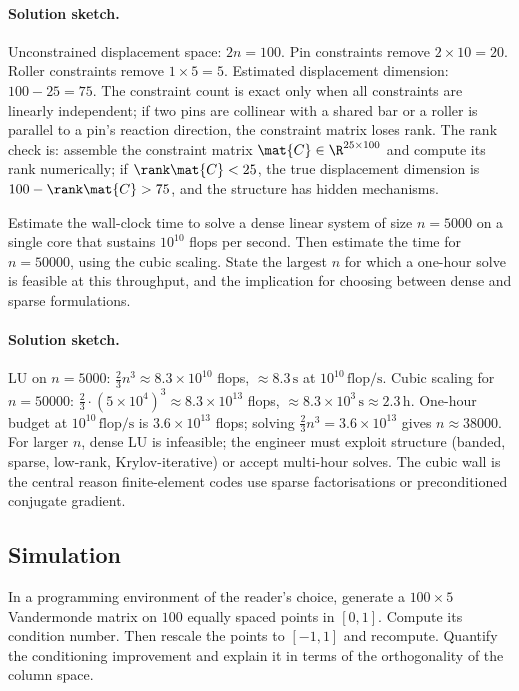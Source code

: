 \paragraph{Solution sketch.}
Unconstrained displacement space: $2 n = 100$. Pin constraints
remove $2 \times 10 = 20$. Roller constraints remove $1 \times 5
= 5$. Estimated displacement dimension: $100 - 25 = 75$. The
constraint count is exact only when all constraints are linearly
independent; if two pins are collinear with a shared bar or a
roller is parallel to a pin's reaction direction, the constraint
matrix loses rank. The rank check is: assemble the constraint
matrix $\mat{C} \in \R^{25 \times 100}$ and compute its rank
numerically; if $\rank \mat{C} < 25$, the true displacement
dimension is $100 - \rank \mat{C} > 75$, and the structure has
hidden mechanisms.

\begin{exercise}
Estimate the wall-clock time to solve a dense linear system of
size $n = 5000$ on a single core that sustains $10^{10}$ flops per
second. Then estimate the time for $n = 50000$, using the cubic
scaling. State the largest $n$ for which a one-hour solve is
feasible at this throughput, and the implication for choosing
between dense and sparse formulations.
\end{exercise}

\paragraph{Solution sketch.}
LU on $n = 5000$: $\tfrac{2}{3} n^{3} \approx 8.3 \times 10^{10}$
flops, $\approx 8.3 \,\text{s}$ at $10^{10}\,\text{flop}/\text{s}$.
Cubic scaling for $n = 50000$: $\tfrac{2}{3} \cdot (5 \times 10^{4})^{3}
\approx 8.3 \times 10^{13}$ flops, $\approx 8.3 \times 10^{3}
\,\text{s} \approx 2.3\,\text{h}$. One-hour budget at $10^{10}
\,\text{flop}/\text{s}$ is $3.6 \times 10^{13}$ flops; solving
$\tfrac{2}{3} n^{3} = 3.6 \times 10^{13}$ gives $n \approx 38000$.
For larger $n$, dense LU is infeasible; the engineer must exploit
structure (banded, sparse, low-rank, Krylov-iterative) or accept
multi-hour solves. The cubic wall is the central reason finite-element
codes use sparse factorisations or preconditioned conjugate gradient.

\subsection*{Simulation}

\begin{exercise}
In a programming environment of the reader's choice, generate a
$100 \times 5$ Vandermonde matrix on $100$ equally spaced points
in $[0, 1]$. Compute its condition number. Then rescale the points
to $[-1, 1]$ and recompute. Quantify the conditioning improvement
and explain it in terms of the orthogonality of the column space.
\end{exercise}

